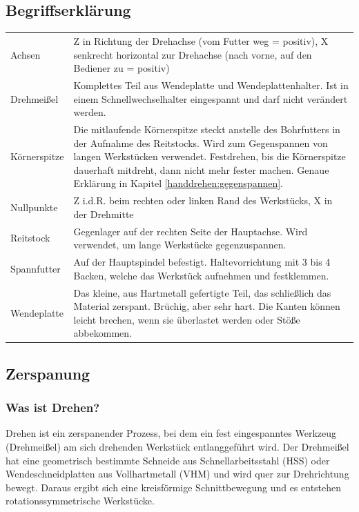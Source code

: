 \documentclass{\basedir/fablab-document}
\begin{document}
\subsection{Begriffserklärung}
\begin{tabular}{p{} p{}}
Achsen 				& Z in Richtung der Drehachse (vom Futter weg = positiv), X senkrecht horizontal zur Drehachse (nach vorne, auf den Bediener zu = positiv) \\
Drehmeißel 		& Komplettes Teil aus Wendeplatte und Wendeplattenhalter. Ist in einem Schnell\-wechsel\-halter eingespannt und darf nicht verändert werden. \\
Körnerspitze 	& Die mitlaufende Körnerspitze steckt anstelle des Bohrfutters in der Aufnahme des Reitstocks. Wird zum Gegenspannen von langen Werkstücken verwendet. Festdrehen, bis die Körnerspitze dauerhaft mitdreht, dann nicht mehr fester machen. Genaue Erklärung in Kapitel \ref{handdrehen:gegenspannen}. \\
Nullpunkte 		& Z i.d.R. beim rechten oder linken Rand des Werkstücks, X in der Drehmitte \\
Reitstock 		& Gegenlager auf der rechten Seite der Hauptachse. Wird verwendet, um lange Werkstücke gegenzuspannen. \\
Spannfutter 	& Auf der Hauptspindel befestigt. Haltevorrichtung mit 3 bis 4 Backen, welche das Werkstück aufnehmen und festklemmen. \\
Wendeplatte 	& Das kleine, aus Hartmetall gefertigte Teil, das schließlich das Material zerspant. Brüchig, aber sehr hart. Die Kanten können leicht brechen, wenn sie überlastet werden oder Stöße abbekommen. \\
\end{tabular}

\subsection{Zerspanung}
\subsubsection{Was ist Drehen?}
Drehen ist ein zerspanender Prozess, bei dem ein fest eingespanntes Werkzeug (Drehmeißel) am sich drehenden Werkstück entlanggeführt wird.
Der Drehmeißel hat eine geometrisch bestimmte Schneide aus Schnellarbeitsstahl (HSS) oder Wendeschneidplatten aus Vollhartmetall (VHM) und wird quer zur Drehrichtung bewegt.
Daraus ergibt sich eine kreisförmige Schnittbewegung und es entstehen rotationssymmetrische Werkstücke.
\end{document}
